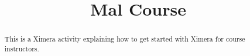 \documentclass{xourse}
\title{Mal Course}%
\begin{document}
      
\begin{abstract} %
This is a Ximera activity explaining how to get started with Ximera for course instructors.
\end{abstract}
\maketitle
      

      
\end{document}
